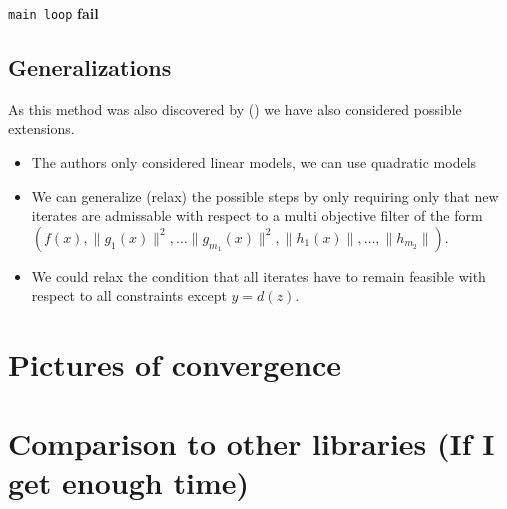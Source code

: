\documentclass{article}
\begin{document}
\begin{algorithm}
\begin{algorithmic}[1]
			\EndIf
		\Else
			\State \Goto \texttt{main loop}
		\EndIf
	\Else
			\textbf{fail}
		\EndIf
	\EndIf
\EndWhile
\EndProcedure
\end{algorithmic}
\end{algorithm}

\FloatBarrier

\subsection{Generalizations}

As this method was also discovered by () we have also considered possible extensions.

\begin{itemize}
\item The authors only considered linear models, we can use quadratic models
\item We can generalize (relax) the possible steps by only requiring only that new iterates are admissable with respect to a multi objective filter of the form $(f(x), \|g_1(x)\|^2, \ldots \|g_{m_1}(x)\|^2, \|h_1(x)\|, \ldots, \|h_{m_2}\|)$.
\item We could relax the condition that all iterates have to remain feasible with respect to all constraints except $y = d(z)$.
\end{itemize}

\section{Pictures of convergence}
\section{Comparison to other libraries (If I get enough time)}




\newpage



\end{document}
